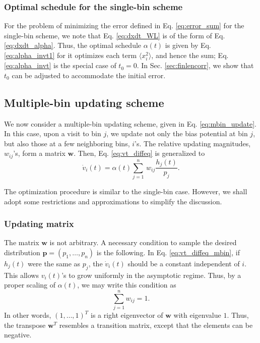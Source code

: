 \documentclass[reprint, floatfix]{revtex4-1}
\begin{document}
\subsubsection{Optimal schedule for the single-bin scheme}



For the problem of
minimizing the error defined in Eq. \eqref{eq:error_sum}
for the single-bin scheme,
we note that Eq. \eqref{eq:dxdt_WL}
is of the form of Eq. \eqref{eq:dxdt_alpha}.
%
Thus,
the optimal schedule $\alpha(t)$ is given by
Eq. \eqref{eq:alpha_invt1}
for it optimizes each term $\langle x_i^2 \rangle$,
and hence the sum;
Eq. \eqref{eq:alpha_invt}
is the special case of $t_0 = 0$.
%
In Sec. \ref{sec:finlencorr},
we show that $t_0$ can be adjusted
to accommodate the initial error.



\subsection{\label{sec:multiple-bin}
Multiple-bin updating scheme}



We now consider a multiple-bin updating scheme,
given in Eq. \eqref{eq:mbin_update}.
%
In this case,
upon a visit to bin $j$,
we update not only the bias potential at bin $j$,
but also those at a few neighboring bins, $i$'s.
%
The relative updating magnitudes,
$w_{ij}$'s,
form a matrix $\mathbf w$.
%
Then, Eq. \eqref{eq:vt_diffeq} is generalized to
\begin{equation}
  \dot v_i(t)
  =
  \alpha(t) \sum_{j=1}^n \, w_{ij} \frac{ h_j(t) } { p_j }.
  \label{eq:vt_diffeq_mbin}
\end{equation}


The optimization procedure is similar to the single-bin case.
However, we shall adopt some restrictions and approximations
to simplify the discussion.



\subsubsection{\label{sec:updating-matrix}
Updating matrix}



The matrix $\mathbf w$ is not arbitrary.
%
A necessary condition to sample
the desired distribution
$\mathbf p = (p_1, \dots, p_n)$
is the following.
%
In Eq. \eqref{eq:vt_diffeq_mbin},
if $h_j(t)$ were the same as $p_j$,
the $\dot v_i(t)$ should be a constant independent of $i$.
%
This allows $v_i(t)$'s to grow uniformly
in the asymptotic regime.
%
Thus, by a proper scaling of $\alpha(t)$,
we may write this condition as
%
\begin{equation}
  \sum_{j = 1}^n w_{ij} = 1
  .
\label{eq:w_sumj}
\end{equation}
%
In other words, $(1, \dots, 1)^T$
is a right eigenvector of $\mathbf w$
with eigenvalue $1$.
%
Thus, the transpose $\mathbf w^T$
resembles a transition matrix,
except that the elements can be negative.
\end{document}
